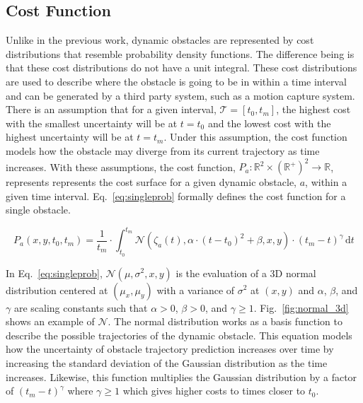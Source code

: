 \subsection{Cost Function}

\label{sec:cost}

Unlike in the previous work, dynamic obstacles are represented by cost
distributions that resemble probability density functions. The difference being
is that these cost distributions do not have a unit integral. These cost
distributions are used to describe where the obstacle is going to be in within
a time interval and can be generated by a third party system, such as a motion
capture system. There is an assumption that for a given interval, $\mathcal{T}
= [t_0, t_m]$, the highest cost with the smallest uncertainty will be at $t =
t_0$ and the lowest cost with the highest uncertainty will be at $t = t_m$.
Under this assumption, the cost function models how the obstacle may diverge
from its current trajectory as time increases. With these assumptions, the cost
function, $P_a: \mathbb{R}^2 \times (\mathbb{R}^+)^2 \rightarrow
\mathbb{R}$, represents represents the cost surface for a given dynamic
obstacle, $a$,  within a given time interval. Eq.~\ref{eq:singleprob} formally
defines the cost function for a single obstacle.


\begin{equation}
    P_a(x, y, t_0, t_m) = \frac{1}{t_m} \cdot \int^{t_m}_{t_0}
    \mathcal{N}(\zeta_a(t), \alpha \cdot (t - t_0)^2 + \beta, x, y) \cdot
    (t_m - t)^{\gamma} \,\mathrm{d}t
    \label{eq:singleprob}
\end{equation}

In Eq.~\ref{eq:singleprob}, $\mathcal{N}(\mu, \sigma^2, x, y)$ is the
evaluation of a 3D normal distribution centered at $(\mu_x, \mu_y)$ with a
variance of $\sigma^2$ at $(x, y)$ and $\alpha$, $\beta$, and $\gamma$ are
scaling constants such that $\alpha > 0$, $\beta > 0$, and $\gamma \geq 1$.
Fig.~\ref{fig:normal_3d} shows an example of $\mathcal{N}$. The normal
distribution works as a basis function to describe the possible trajectories of
the dynamic obstacle. This equation models how the uncertainty of obstacle
trajectory prediction increases over time by increasing the standard deviation
of the Gaussian distribution as the time increases.  Likewise, this function
multiplies the Gaussian distribution by a factor of $(t_m - t)^{\gamma}$ where
$\gamma \geq 1$ which gives higher costs to times closer to $t_0$.

